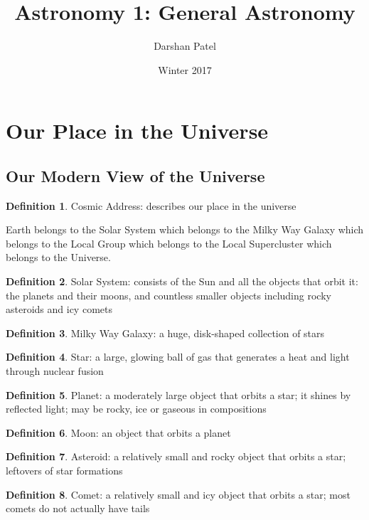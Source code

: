 \documentclass[12pt]{article}
\begin{document}
\theoremstyle{definition}
\newtheorem{theorem}{Theorem}[section]
\newtheorem{definition}{Definition}[section]
\newtheorem{example}{Example}[section]

\title{Astronomy 1: General Astronomy}
\author{Darshan Patel}
\date{Winter 2017}
\maketitle

\tableofcontents

\section{Our Place in the Universe}
\subsection{Our Modern View of the Universe}
\begin{definition} Cosmic Address: describes our place in the universe \end{definition}
Earth belongs to the Solar System which belongs to the Milky Way Galaxy which belongs to the Local Group which belongs to the Local Supercluster which belongs to the Universe.
\begin{definition} Solar System: consists of the Sun and all the objects that orbit it: the planets and their moons, and countless smaller objects including rocky asteroids and icy comets \end{definition}
\begin{definition} Milky Way Galaxy: a huge, disk-shaped collection of stars \end{definition} 
\begin{definition} Star: a large, glowing ball of gas that generates a heat and light through nuclear fusion \end{definition}
\begin{definition} Planet: a moderately large object that orbits a star; it shines by reflected light; may be rocky, ice or gaseous in compositions \end{definition} 
\begin{definition} Moon: an object that orbits a planet \end{definition} 
\begin{definition} Asteroid: a relatively small and rocky object that orbits a star; leftovers of star formations \end{definition} 
\begin{definition} Comet: a relatively small and icy object that orbits a star; most comets do not actually have tails \end{definition} 
\end{document}
